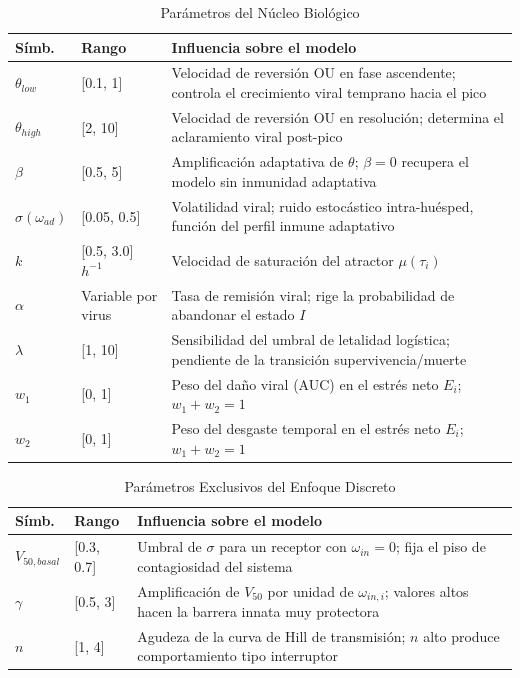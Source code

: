 \documentclass[conference]{IEEEtran}
\begin{document}
\begin{table}[!t]
\renewcommand{\arraystretch}{1.25}
\caption{Parámetros del Núcleo Biológico}
\label{tab:param_nucleo}
\centering
\begin{tabular}{p{1.1cm}p{1.2cm}p{4.5cm}}
\hline
\textbf{Símb.} & \textbf{Rango} & \textbf{Influencia sobre el modelo} \\
\hline
$\theta_{low}$ & [0.1, 1] & Velocidad de reversión OU en fase ascendente; controla el crecimiento viral temprano hacia el pico \\
$\theta_{high}$ & [2, 10] & Velocidad de reversión OU en resolución; determina el aclaramiento viral post-pico \\
$\beta$ & [0.5, 5] & Amplificación adaptativa de $\theta$; $\beta=0$ recupera el modelo sin inmunidad adaptativa \\
$\sigma(\omega_{ad})$ & [0.05, 0.5] & Volatilidad viral; ruido estocástico intra-huésped, función del perfil inmune adaptativo \\
$k$ & [0.5, 3.0] $h^{-1}$ & Velocidad de saturación del atractor $\mu(\tau_i)$ \\
$\alpha$ & Variable por virus & Tasa de remisión viral; rige la probabilidad de abandonar el estado $I$ \\
$\lambda$ & [1, 10] & Sensibilidad del umbral de letalidad logística; pendiente de la transición supervivencia/muerte \\
$w_1$ & [0, 1] & Peso del daño viral (AUC) en el estrés neto $E_i$; $w_1+w_2=1$ \\
$w_2$ & [0, 1] & Peso del desgaste temporal en el estrés neto $E_i$; $w_1+w_2=1$ \\
\hline
\end{tabular}
\end{table}

\begin{table}[!t]
\renewcommand{\arraystretch}{1.25}
\caption{Parámetros Exclusivos del Enfoque Discreto}
\label{tab:param_discreto}
\centering
\begin{tabular}{p{1.3cm}p{1.2cm}p{4.3cm}}
\hline
\textbf{Símb.} & \textbf{Rango} & \textbf{Influencia sobre el modelo} \\
\hline
$V_{50,basal}$ & [0.3, 0.7] & Umbral de $\sigma$ para un receptor con $\omega_{in}=0$; fija el piso de contagiosidad del sistema \\
$\gamma$ & [0.5, 3] & Amplificación de $V_{50}$ por unidad de $\omega_{in,i}$; valores altos hacen la barrera innata muy protectora \\
$n$ & [1, 4] & Agudeza de la curva de Hill de transmisión; $n$ alto produce comportamiento tipo interruptor \\
\hline
\end{tabular}
\end{table}
\end{document}
